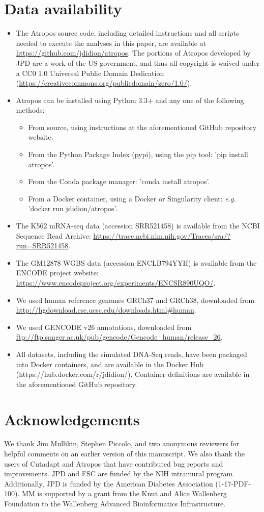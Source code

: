 \documentclass[fleqn,10pt,lineno]{wlpeerj} %
\begin{document}
\section{Data availability}
\begin{itemize}
\item The Atropos source code, including detailed instructions and all scripts needed to execute the analyses in this paper, are available at \url{https://github.com/jdidion/atropos}. The portions of Atropos developed by JPD are a work of the US government, and thus all copyright is waived under a CC0 1.0 Universal Public Domain Dedication (\url{https://creativecommons.org/publicdomain/zero/1.0/}).
\item Atropos can be installed using Python 3.3+ and any one of the following methods:
\begin{itemize}
\item From source, using instructions at the aforementioned GitHub repository website.
\item From the Python Package Index (pypi), using the pip tool: 'pip install atropos'.
\item From the Conda package manager: 'conda install atropos'.
\item From a Docker container, using a Docker or Singularity client: \textit{e.g.} 'docker run jdidion/atropos'.
\end{itemize}
\item The K562 mRNA-seq data (accession SRR521458) is available from the NCBI Sequence Read Archive: \url{https://trace.ncbi.nlm.nih.gov/Traces/sra/?run=SRR521458}.
\item The GM12878 WGBS data (accession ENCLB794YYH) is available from the ENCODE project website: \url{https://www.encodeproject.org/experiments/ENCSR890UQO/}.
\item We used human reference genomes GRCh37 and GRCh38, downloaded from \url{http://hgdownload.cse.ucsc.edu/downloads.html#human}.
\item We used GENCODE v26 annotations, downloaded from \url{ftp://ftp.sanger.ac.uk/pub/gencode/Gencode_human/release_26}.
\item All datasets, including the simulated DNA-Seq reads, have been packaged into Docker containers, and are available in the Docker Hub (https://hub.docker.com/r/jdidion/). Container definitions are available in the aforementioned GitHub repository.
\end{itemize}

\section{Acknowledgements}
We thank Jim Mullikin, Stephen Piccolo, and two anonymous reviewers for helpful comments on an earlier version of this manuscript. We also thank the users of Cutadapt and Atropos that have contributed bug reports and improvements. JPD and FSC are funded by the NIH intramural program. Additionally, JPD is funded by the American Diabetes Association (1-17-PDF-100). MM is supported by a grant from the Knut and Alice Wallenberg Foundation to the Wallenberg Advanced Bioinformatics Infrastructure.


\end{document}
